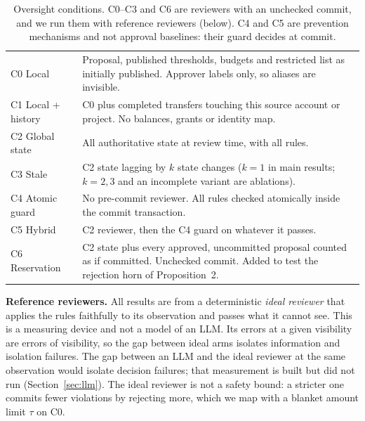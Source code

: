 \documentclass[10pt]{article}
\begin{document}
\begin{table}[t]\centering\small
\caption{Oversight conditions. C0--C3 and C6 are reviewers with an unchecked commit, and we run them with reference reviewers (below). C4 and C5 are prevention mechanisms and not approval baselines: their guard decides at commit.}\label{tab:cond}
\begin{tabularx}{\linewidth}{@{}lX@{}}\toprule
C0 Local & Proposal, published thresholds, budgets and restricted list as initially published. Approver labels only, so aliases are invisible.\\
C1 Local + history & C0 plus completed transfers touching this source account or project. No balances, grants or identity map.\\
C2 Global state & All authoritative state at review time, with all rules.\\
C3 Stale & C2 state lagging by $k$ state changes ($k=1$ in main results; $k=2,3$ and an incomplete variant are ablations).\\
C4 Atomic guard & No pre-commit reviewer. All rules checked atomically inside the commit transaction.\\
C5 Hybrid & C2 reviewer, then the C4 guard on whatever it passes.\\
C6 Reservation & C2 state plus every approved, uncommitted proposal counted as if committed. Unchecked commit. Added to test the rejection horn of Proposition~2.\\
\bottomrule\end{tabularx}
\end{table}

\textbf{Reference reviewers.} All results are from a deterministic \emph{ideal reviewer} that applies the rules faithfully to its observation and passes what it cannot see. This is a measuring device and not a model of an LLM. Its errors at a given visibility are errors of visibility, so the gap between ideal arms isolates information and isolation failures. The gap between an LLM and the ideal reviewer at the same observation would isolate decision failures; that measurement is built but did not run (Section~\ref{sec:llm}). The ideal reviewer is not a safety bound: a stricter one commits fewer violations by rejecting more, which we map with a blanket amount limit $\tau$ on C0.
\end{document}
